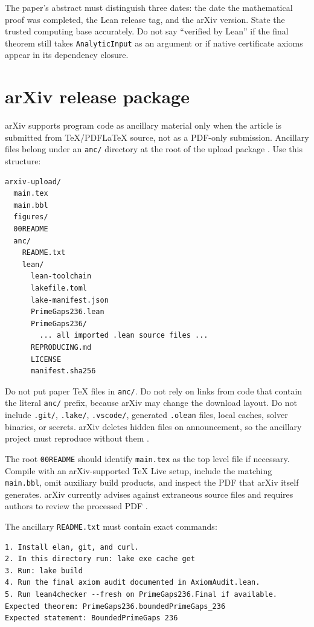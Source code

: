 \documentclass[11pt]{article}
\newcommand{\leanname}[1]{\texttt{#1}}
\begin{document}
The paper's abstract must distinguish three dates: the date the mathematical
proof was completed, the Lean release tag, and the arXiv version.  State the
trusted computing base accurately.  Do not say ``verified by Lean'' if the
final theorem still takes \leanname{AnalyticInput} as an argument or if native
certificate axioms appear in its dependency closure.

\section{arXiv release package}

arXiv supports program code as ancillary material only when the article is
submitted from TeX/PDFLaTeX source, not as a PDF-only submission.  Ancillary
files belong under an \leanname{anc/} directory at the root of the upload
package \cite{ArxivAncillary}.  Use this structure:

\begin{lstlisting}[language={}]
arxiv-upload/
  main.tex
  main.bbl
  figures/
  00README
  anc/
    README.txt
    lean/
      lean-toolchain
      lakefile.toml
      lake-manifest.json
      PrimeGaps236.lean
      PrimeGaps236/
        ... all imported .lean source files ...
      REPRODUCING.md
      LICENSE
      manifest.sha256
\end{lstlisting}

Do not put paper TeX files in \leanname{anc/}.  Do not rely on links from code
that contain the literal \leanname{anc/} prefix, because arXiv may change the
download layout.  Do not include \leanname{.git/}, \leanname{.lake/},
\leanname{.vscode/}, generated \leanname{.olean} files, local caches, solver
binaries, or secrets.  arXiv deletes hidden files on announcement, so the
ancillary project must reproduce without them \cite{ArxivTeX}.

The root \leanname{00README} should identify \leanname{main.tex} as the top
level file if necessary.  Compile with an arXiv-supported TeX Live setup,
include the matching \leanname{main.bbl}, omit auxiliary build products, and
inspect the PDF that arXiv itself generates.  arXiv currently advises against
extraneous source files and requires authors to review the processed PDF
\cite{ArxivTeX}.

The ancillary \leanname{README.txt} must contain exact commands:

\begin{lstlisting}[language={}]
1. Install elan, git, and curl.
2. In this directory run: lake exe cache get
3. Run: lake build
4. Run the final axiom audit documented in AxiomAudit.lean.
5. Run lean4checker --fresh on PrimeGaps236.Final if available.
Expected theorem: PrimeGaps236.boundedPrimeGaps_236
Expected statement: BoundedPrimeGaps 236
\end{lstlisting}
\end{document}
